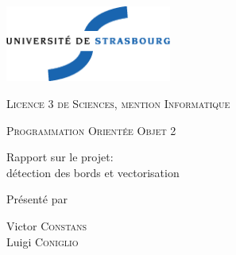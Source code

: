 \thispagestyle{empty}

\begin{center}
       \noindent
       \includegraphics[height=2.5cm]{./pics/uds.eps}       
       
       \vfill\vfill

    {\large \textsc{Licence 3 de Sciences, mention Informatique}}

    \bigskip\bigskip

    {\large \textsc{Programmation Orientée Objet 2 }}

    \vfill\vfill

    {\huge \sc
      \begin{center} 
        Rapport sur le projet: \\
        détection des bords et vectorisation
      \end{center}}

    \vfill\vfill

    {\large Présenté par}

\medskip

    {\large Victor \textsc{Constans}}\\
    {\large Luigi  \textsc{Coniglio}}\\
\bigskip

\end{center}

